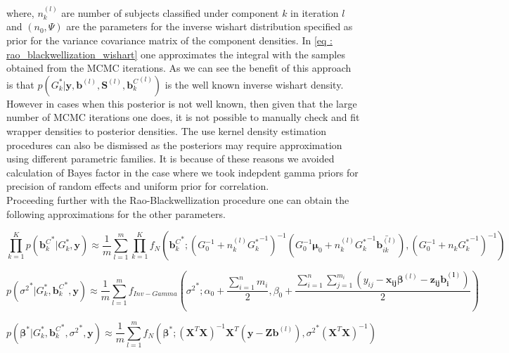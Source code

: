 where, $n_k^{(l)}$ are number of subjects classified under component $k$ in iteration $l$ and $(n_0, \Psi)$ are the parameters for the inverse wishart distribution specified as prior for the variance covariance matrix of the component densities. In \ref{eq : rao_blackwellization_wishart} one approximates the integral with the samples obtained from the MCMC iterations. As we can see the benefit of this approach is that $p(G_k^*| \boldsymbol{y}, \boldsymbol{b}^{(l)}, \boldsymbol{S}^{(l)}, {\boldsymbol{b}_k^C}^{(l)})$ is the well known inverse wishart density. However in cases when this posterior is not well known, then given that the large number of MCMC iterations one does, it is not possible to manually check and fit wrapper densities to posterior densities. The use kernel density estimation procedures can also be dismissed as the posteriors may require approximation using different parametric families. It is because of these reasons we avoided calculation of Bayes factor in the case where we took indepdent gamma priors for precision of random effects and uniform prior for correlation.\\

Proceeding further with the Rao-Blackwellization procedure one can obtain the following approximations for the other parameters.

\begin{equation}
\prod_{k=1}^K p({\boldsymbol{b}_k^C}^*|G_k^*, \boldsymbol{y}) \approx 
\frac 1 m \sum_{l=1}^m \prod_{k=1}^{K} f_N({\boldsymbol{b}_k^C}^*; (G_0^{-1} + n_k^{(l)} {G_k^*}^{-1})^{-1} (G_0^{-1}\boldsymbol{\mu}_0 + n_k^{(l)} {G_k^*}^{-1} \bar{\boldsymbol{b}_{ik}^{(l)}}) , (G_0^{-1} + n_k {G_k^*}^{-1})^{-1})
\end{equation}

\begin{equation}
p({\sigma^2}^*|G_k^*, {\boldsymbol{b}_k^C}^*, \boldsymbol{y}) \approx 
\frac 1 m \sum_{l=1}^m f_{Inv-Gamma}({\sigma^2}^*; \alpha_0 + \frac {\sum_{i=1}^n m_i} 2, 
\beta_0 + \frac {\sum_{i=1}^n \sum_{j=1}^{m_i} (y_{ij} - \boldsymbol{x_{ij}}\boldsymbol{\beta}^{(l)} - \boldsymbol{z_{ij}}\boldsymbol{b_i^{(l)}})} 2)
\end{equation}

\begin{equation}
p({\boldsymbol{\beta}}^*|G_k^*, {\boldsymbol{b}_k^C}^*, {\sigma^2}^*, \boldsymbol{y}) \approx 
\frac 1 m \sum_{l=1}^m f_N({\boldsymbol{\beta}}^*; (\boldsymbol{X}^T\boldsymbol{X})^{-1}\boldsymbol{X}^T(\boldsymbol{y} - {\boldsymbol{Zb}}^{(l)}), {\sigma^2}^*(\boldsymbol{X}^T\boldsymbol{X})^{-1})
\end{equation}

